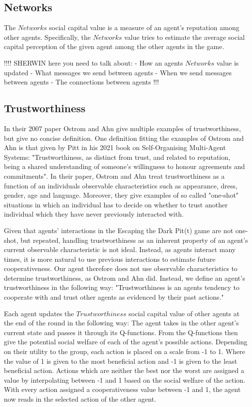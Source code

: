 \subsection{Networks}

The $Networks$ social capital value is a measure of an agent's reputation among other agents. Specifically, the $Networks$ value tries to estimate the average social capital perception of the given agent among the other agents in the game. 

 !!!!
SHERWIN here you need to talk about:
- How an agents $Networks$ value is updated
- What messages we send between agents
- When we send messages between agents
- The connections between agents
 !!!

\subsection{Trustworthiness}

In their 2007 paper Ostrom and Ahn give multiple examples of trustworthiness, but give no concise definition. One definition fitting the examples of Ostrom and Ahn is that given by Pitt in his 2021 book on Self-Organising Multi-Agent Systems: "Trustworthiness, as distinct from trust, and related to reputation, being a shared understanding of someone’s willingness to honour agreements and commitments"\cite{pitt}. In their paper, Ostrom and Ahn treat trustworthiness as a function of an individuals observable characteristics such as appearance, dress, gender, age and language. Moreover, they give examples of so called "one-shot" situations in which an individual has to decide on whether to trust another individual which they have never previously interacted with.\cite{ostrom-ahn}

Given that agents' interactions in the Escaping the Dark Pit(t) game are not one-shot, but repeated, handling trustworthiness as an inherent property of an agent's current observable characteristic is not ideal. Instead, as agents interact many times, it is more natural to use previous interactions to estimate future cooperativeness. Our agent therefore does not use observable characteristics to determine trustworthiness, as Ostrom and Ahn did. Instead, we define an agent's trustworthiness in the following way: "Trustworthiness is an agents tendency to cooperate with and trust other agents as evidenced by their past actions."

Each agent updates the $Trustworthiness$ social capital value of other agents at the end of the round in the following way: The agent takes in the other agent's current state and passes it through its Q-functions. From the Q-functions then give the potential social welfare of each of the agent's possible actions. Depending on their utility to the group, each action is placed on a scale from -1 to 1. Where the value of 1 is given to the most beneficial action and -1 is given to the least beneficial action. Actions which are neither the best nor the worst are assigned a value by interpolating between -1 and 1 based on the social welfare of the action. With every action assigned a cooperativeness value between -1 and 1, the agent now reads in the selected action of the other agent. 

